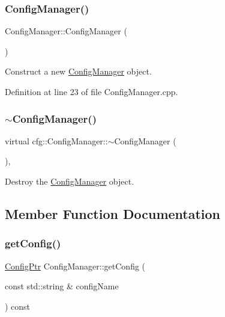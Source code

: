 \subsubsection{\texorpdfstring{Config\+Manager()}{ConfigManager()}\hspace{0.1cm}{\footnotesize\ttfamily [2/2]}}
{\footnotesize\ttfamily Config\+Manager\+::\+Config\+Manager (\begin{DoxyParamCaption}{ }\end{DoxyParamCaption})}



Construct a new \hyperlink{classcfg_1_1_config_manager}{Config\+Manager} object. 



Definition at line 23 of file Config\+Manager.\+cpp.

\mbox{\label{classcfg_1_1_config_manager_a0b0ce1e9ef223cd18360eaaeecc7e1ab}} 
\subsubsection{\texorpdfstring{$\sim$\+Config\+Manager()}{~ConfigManager()}}
{\footnotesize\ttfamily virtual cfg\+::\+Config\+Manager\+::$\sim$\+Config\+Manager (\begin{DoxyParamCaption}{ }\end{DoxyParamCaption})\hspace{0.3cm}{\ttfamily [virtual]}, {\ttfamily [default]}}



Destroy the \hyperlink{classcfg_1_1_config_manager}{Config\+Manager} object. 



\subsection{Member Function Documentation}
\mbox{\label{classcfg_1_1_config_manager_aa71c6277d421969606433b77d425d19d}} 
\subsubsection{\texorpdfstring{get\+Config()}{getConfig()}}
{\footnotesize\ttfamily \hyperlink{namespacecfg_af5f3a3fc2010c76e90bc66696485989f}{Config\+Ptr} Config\+Manager\+::get\+Config (\begin{DoxyParamCaption}\item[{const std\+::string \&}]{config\+Name }\end{DoxyParamCaption}) const}



